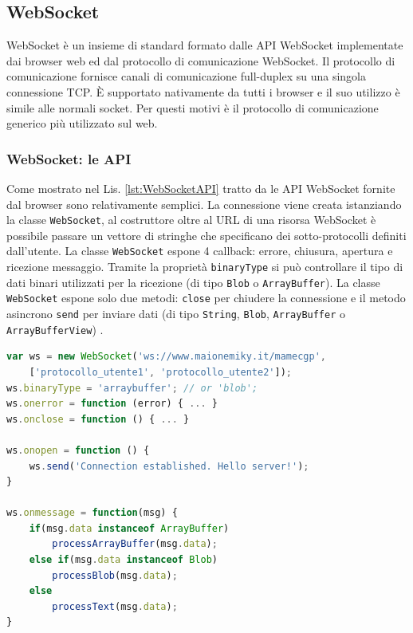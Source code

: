 \subsection{WebSocket}
WebSocket è un insieme di standard formato dalle API WebSocket implementate dai browser web ed dal protocollo di comunicazione WebSocket. Il protocollo di comunicazione fornisce canali di comunicazione full-duplex su una singola connessione TCP. È supportato nativamente da tutti i browser e il suo utilizzo è simile alle normali socket. Per questi motivi è il protocollo di comunicazione generico più utilizzato sul web.

\subsubsection{WebSocket: le API}
Come mostrato nel Lis. \ref{lst:WebSocketAPI} tratto da \parencite{High_Performance_Browser_Networking} le API WebSocket fornite dal browser sono relativamente semplici. La connessione viene creata istanziando la classe \verb|WebSocket|, al costruttore oltre al URL di una risorsa WebSocket è possibile passare un vettore di stringhe che specificano dei sotto-protocolli definiti dall'utente. La classe \verb|WebSocket| espone 4 callback: errore, chiusura, apertura e ricezione messaggio. Tramite la proprietà \verb|binaryType| si può controllare il tipo di dati binari utilizzati per la ricezione (di tipo \verb|Blob| o \verb|ArrayBuffer|). La classe \verb|WebSocket| espone solo due metodi: \verb|close| per chiudere la connessione e il metodo asincrono \verb|send| per inviare dati (di tipo \verb|String|, \verb|Blob|, \verb|ArrayBuffer| o \verb|ArrayBufferView|) \parencite{WebSocket_Web_APIs}.

\begin{lstlisting}[language=JavaScript, caption=Esempio di codice delle API WebSocket, label={lst:WebSocketAPI}]
var ws = new WebSocket('ws://www.maionemiky.it/mamecgp', 
	['protocollo_utente1', 'protocollo_utente2']);
ws.binaryType = 'arraybuffer'; // or 'blob';
ws.onerror = function (error) { ... } 
ws.onclose = function () { ... } 

ws.onopen = function () { 
	ws.send('Connection established. Hello server!'); 
}

ws.onmessage = function(msg) { 
	if(msg.data instanceof ArrayBuffer)
		processArrayBuffer(msg.data);
	else if(msg.data instanceof Blob)
		processBlob(msg.data);
	else
		processText(msg.data);	
}
\end{lstlisting}

